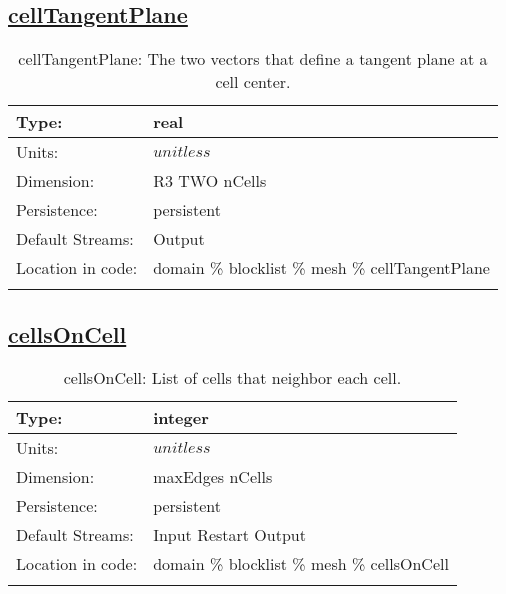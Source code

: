 \subsection[cellTangentPlane]{\hyperref[sec:var_tab_mesh]{cellTangentPlane}}
\label{subsec:var_sec_mesh_cellTangentPlane}
\begin{center}
\begin{longtable}{| p{2.0in} | p{4.0in} |}
        \hline 
        Type: & real \\
        \hline 
        Units: & $unitless$ \\
        \hline 
        Dimension: & R3 TWO nCells \\
        \hline 
        Persistence: & persistent \\
        \hline 
		 Default Streams: & Output  \\
        \hline 
		 Location in code: & domain \% blocklist \% mesh \% cellTangentPlane \\
		 \hline 
    \caption{cellTangentPlane: The two vectors that define a tangent plane at a cell center.}
\end{longtable}
\end{center}
\subsection[cellsOnCell]{\hyperref[sec:var_tab_mesh]{cellsOnCell}}
\label{subsec:var_sec_mesh_cellsOnCell}
\begin{center}
\begin{longtable}{| p{2.0in} | p{4.0in} |}
        \hline 
        Type: & integer \\
        \hline 
        Units: & $unitless$ \\
        \hline 
        Dimension: & maxEdges nCells \\
        \hline 
        Persistence: & persistent \\
        \hline 
		 Default Streams: & Input Restart Output  \\
        \hline 
		 Location in code: & domain \% blocklist \% mesh \% cellsOnCell \\
		 \hline 
    \caption{cellsOnCell: List of cells that neighbor each cell.}
\end{longtable}
\end{center}
